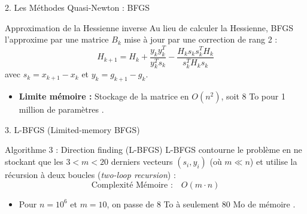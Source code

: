 \documentclass{beamer}
\begin{document}
\begin{frame}{2. Les Méthodes Quasi-Newton : BFGS}
    \begin{block}{Approximation de la Hessienne inverse}
        Au lieu de calculer la Hessienne, BFGS l'approxime par une matrice $B_k$ mise à jour par une correction de rang 2 \cite{gramfort_quasi_newton} :
        \begin{equation}
            H_{k+1} = H_k + \frac{y_k y_k^T}{y_k^T s_k} - \frac{H_k s_k s_k^T H_k}{s_k^T H_k s_k}
        \end{equation}
        avec $s_k = x_{k+1} - x_k$ et $y_k = g_{k+1} - g_k$.
    \end{block}
    \begin{itemize}
        \item \textbf{Limite mémoire :} Stockage de la matrice en $O(n^2)$, soit 8 To pour 1 million de paramètres \cite{synapsara_video}.
    \end{itemize}
\end{frame}

\begin{frame}{3. L-BFGS (Limited-memory BFGS)}
    \begin{block}{Algorithme 3 : Direction finding (L-BFGS)}
        L-BFGS contourne le problème en ne stockant que les $3<m<20$ derniers vecteurs $(s_i, y_i)$ (où $m \ll n$) et utilise la récursion à deux boucles (\emph{two-loop recursion}) \cite{gramfort_quasi_newton} :
        \begin{equation}
            \text{Complexité Mémoire :} \quad O(m \cdot n)
        \end{equation}
    \end{block}
    \begin{itemize}
        \item Pour $n = 10^6$ et $m = 10$, on passe de 8 To à seulement 80 Mo de mémoire \cite{synapsara_video}.
    \end{itemize}
\end{frame}
\end{document}
